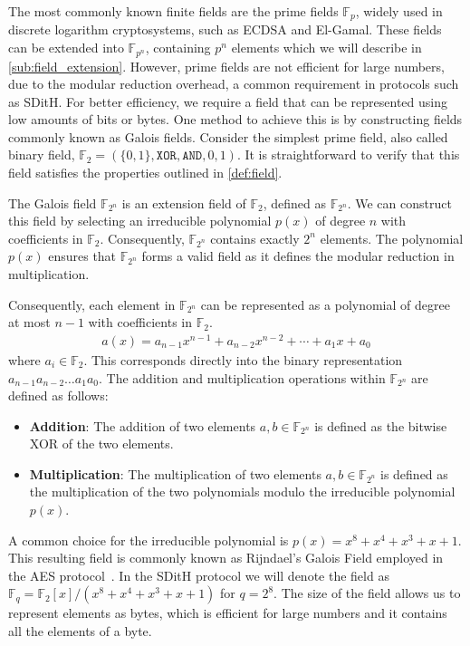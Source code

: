 \documentclass[11pt]{report}
\theoremstyle{definition}
\theoremstyle{plain}
\begin{document}
\noindent
The most commonly known finite fields are the prime fields $\mathbb{F}_p$, widely used in discrete logarithm cryptosystems, such as ECDSA and El-Gamal. These fields can be extended into $\mathbb{F}_{p^n}$, containing $p^n$ elements which we will describe in \autoref{sub:field_extension}. However, prime fields are not efficient for large numbers, due to the modular reduction overhead, a common requirement in protocols such as SDitH. For better efficiency, we require a field that can be represented using low amounts of bits or bytes. One method to achieve this is by constructing fields commonly known as Galois fields. Consider the simplest prime field, also called binary field, $\mathbb{F}_2 = (\{0,1\}, \texttt{XOR}, \texttt{AND}, 0, 1)$. It is straightforward to verify that this field satisfies the properties outlined in \autoref{def:field}.

The Galois field $\mathbb{F}_{2^n}$ is an extension field of $\mathbb{F}_2$, defined as $\mathbb{F}_{2^n}$. We can construct this field by selecting an irreducible polynomial $p(x)$ of degree $n$ with coefficients in $\mathbb{F}_2$. Consequently, $\mathbb{F}_{2^n}$ contains exactly $2^n$ elements. The polynomial $p(x)$ ensures that $\mathbb{F}_{2^n}$ forms a valid field as it defines the modular reduction in multiplication.

Consequently, each element in $\mathbb{F}_{2^n}$ can be represented as a polynomial of degree at most $n-1$ with coefficients in $\mathbb{F}_2$.
\begin{align*}
  a(x) = a_{n-1}x^{n-1} + a_{n-2}x^{n-2} + \cdots + a_1x + a_0
\end{align*}
\noindent
where $a_i \in \mathbb{F}_2$. This corresponds directly into the binary representation $a_{n-1}a_{n-2}\dots a_1a_0$. The addition and multiplication operations within $\mathbb{F}_{2^n}$ are defined as follows:

\begin{itemize}
  \item \textbf{Addition}: The addition of two elements $a,b \in \mathbb{F}_{2^n}$ is defined as the bitwise XOR of the two elements.
  \item \textbf{Multiplication}: The multiplication of two elements $a,b \in \mathbb{F}_{2^n}$ is defined as the multiplication of the two polynomials modulo the irreducible polynomial $p(x)$.
\end{itemize}

A common choice for the irreducible polynomial is $p(x) = x^8 + x^4 + x^3 + x + 1$. This resulting field is commonly known as Rijndael's Galois Field employed in the AES protocol~\cite{brownadvanced}. In the SDitH protocol we will denote the field as $\mathbb{F}_{q} = \mathbb{F}_2[x]/(x^8 + x^4 + x^3 + x + 1)$ for $q=2^8$. The size of the field allows us to represent elements as bytes, which is efficient for large numbers and it contains all the elements of a byte.
\end{document}
